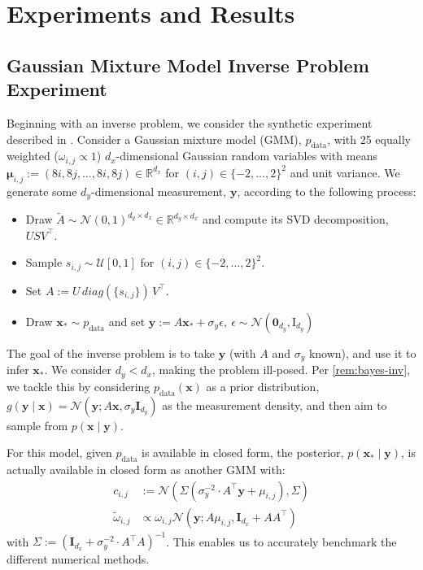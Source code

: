\chapter{Experiments and Results} \label{chap:experiments}

\section{Gaussian Mixture Model Inverse Problem Experiment} \label{sec:gmm}

Beginning with an inverse problem, we consider the synthetic experiment described in
\textcite{cardosoMonteCarloGuided2023,boysTweedieMomentProjected2023}.
Consider a Gaussian mixture model (GMM), $p_{\text{data}}$, with 25 equally weighted
($\omega_{i,j} \propto 1$) $d_x$-dimensional Gaussian random variables with means
$\mathbf{\mu}_{i,j} := (8i, 8j, \dots, 8i, 8j) \in \mathbb{R}^{d_x}$
for $(i, j)\in \{-2, \ldots, 2\}^2$ and unit variance.
We generate some $d_y$-dimensional measurement, $\mathbf{y}$, according to the following process:
\begin{itemize}
    \item Draw $\tilde{A} \sim \mathcal{N}(0, 1)^{d_y \times d_x} \in \mathbb{R}^{d_y \times d_x}$
    and compute its SVD decomposition, $USV^\top$.
    \item Sample $s_{i,j} \sim \mathcal{U}[0,1]$ for $(i,j) \in \{-2, \dots, 2\}^2$.
    \item Set $A := U\, diag(\{s_{i,j}\})\, V^\top$.
    \item Draw $\mathbf{x}_* \sim p_{\text{data}}$ and set $\mathbf{y} := A\mathbf{x}_* + \sigma_y\epsilon,\ \epsilon \sim \mathcal{N}(\mathbf{0}_{d_y}, \mathrm{I}_{d_y})$
\end{itemize}

The goal of the inverse problem is to take $\mathbf{y}$ (with $A$ and $\sigma_y$ known), and use
it to infer $\mathbf{x}_*$. We consider $d_y < d_x$, making the problem ill-posed. Per
\autoref{rem:bayes-inv}, we tackle this by considering $p_{\text{data}}(\mathbf{x})$ as a prior
distribution,
$g(\mathbf{y} \mid \mathbf{x}) = \mathcal{N}(\mathbf{y}; A\mathbf{x}, \sigma_y\mathbf{I}_{d_y})$
as the measurement density, and then aim to sample from $p(\mathbf{x} \mid \mathbf{y})$.

For this model, given $p_{\text{data}}$ is available in closed form, the posterior,
$p(\mathbf{x}_* \mid \mathbf{y})$, is actually available in closed form as another GMM with:
\begin{align*}
    c_{i,j} &:= \mathcal{N}\left(\Sigma\left(\sigma_y^{-2}\cdot A^\top\mathbf{y} + \mu_{i,j}\right), \Sigma\right) \\
    \tilde{\omega}_{i,j} &\propto \omega_{i,j} \mathcal{N}\left(\mathbf{y}; A\mu_{i,j}, \mathbf{I}_{d_x} + AA^\top \right)
\end{align*}
with $\Sigma := \left(\mathbf{I}_{d_x} + \sigma_y^{-2}\cdot A^\top A\right)^{-1}$. This enables
us to accurately benchmark the different numerical methods.

